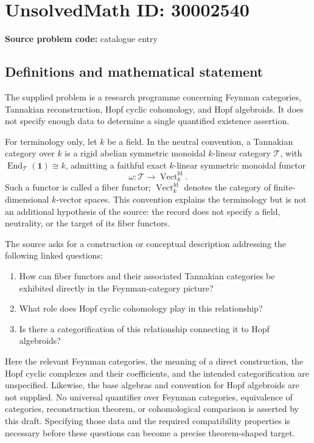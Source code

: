 \documentclass[11pt]{article}
\begin{document}
\section*{UnsolvedMath ID: 30002540}
\textbf{Source problem code:} catalogue entry
\subsection{Definitions and mathematical statement}
The supplied problem is a research programme concerning Feynman categories, Tannakian reconstruction, Hopf cyclic cohomology, and Hopf algebroids. It does not specify enough data to determine a single quantified existence assertion.

For terminology only, let \(k\) be a field. In the neutral convention, a Tannakian category over \(k\) is a rigid abelian symmetric monoidal \(k\)-linear category \(\mathcal T\), with \(\operatorname{End}_{\mathcal T}(\mathbf 1)\cong k\), admitting a faithful exact \(k\)-linear symmetric monoidal functor
\[
\omega:\mathcal T\longrightarrow\operatorname{Vect}^{\mathrm{fd}}_k.
\]
Such a functor is called a fiber functor; \(\operatorname{Vect}^{\mathrm{fd}}_k\) denotes the category of finite-dimensional \(k\)-vector spaces. This convention explains the terminology but is not an additional hypothesis of the source: the record does not specify a field, neutrality, or the target of its fiber functors.

The source asks for a construction or conceptual description addressing the following linked questions:
\begin{enumerate}
\item How can fiber functors and their associated Tannakian categories be exhibited directly in the Feynman-category picture?
\item What role does Hopf cyclic cohomology play in this relationship?
\item Is there a categorification of this relationship connecting it to Hopf algebroids?
\end{enumerate}
Here the relevant Feynman categories, the meaning of a direct construction, the Hopf cyclic complexes and their coefficients, and the intended categorification are unspecified. Likewise, the base algebras and convention for Hopf algebroids are not supplied. No universal quantifier over Feynman categories, equivalence of categories, reconstruction theorem, or cohomological comparison is asserted by this draft. Specifying those data and the required compatibility properties is necessary before these questions can become a precise theorem-shaped target.
\end{document}
